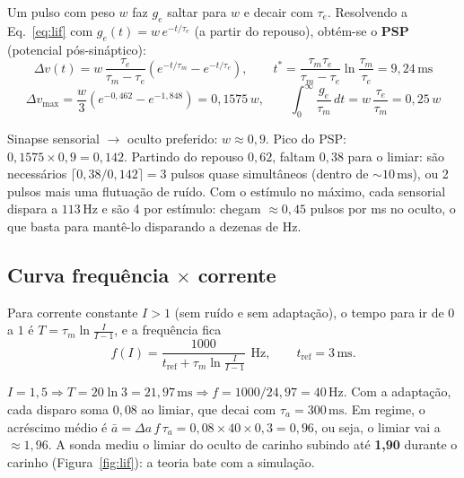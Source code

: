 \documentclass[11pt,a4paper]{article}
\newcommand{\ms}{\,\mathrm{ms}}
\newcommand{\Hz}{\,\mathrm{Hz}}
\begin{document}
Um pulso com peso $w$ faz $g_e$ saltar para $w$ e decair com $\tau_e$. Resolvendo a Eq.~\eqref{eq:lif} com $g_e(t) = w\,e^{-t/\tau_e}$
(a partir do repouso), obtém-se o \textbf{PSP} (potencial pós-sináptico):
\begin{equation}
\Delta v(t) = w\,\frac{\tau_e}{\tau_m - \tau_e}\left(e^{-t/\tau_m} - e^{-t/\tau_e}\right),
\qquad t^\ast = \frac{\tau_m\tau_e}{\tau_m-\tau_e}\ln\frac{\tau_m}{\tau_e} = 9{,}24\ms
\end{equation}
\begin{equation}
\Delta v_{\max} = \frac{w}{3}\left(e^{-0{,}462} - e^{-1{,}848}\right) = 0{,}1575\,w, \qquad
\int_0^\infty \frac{g_e}{\tau_m}\,dt = w\,\frac{\tau_e}{\tau_m} = 0{,}25\,w
\end{equation}

\begin{exemplo}
Sinapse sensorial $\to$ oculto preferido: $w \approx 0{,}9$. Pico do PSP: $0{,}1575 \times 0{,}9 = 0{,}142$.
Partindo do repouso $0{,}62$, faltam $0{,}38$ para o limiar: são necessários
$\lceil 0{,}38 / 0{,}142 \rceil = 3$ pulsos quase simultâneos (dentro de $\sim 10\ms$), ou 2 pulsos mais uma flutuação de ruído.
Com o estímulo no máximo, cada sensorial dispara a $113\Hz$ e são 4 por estímulo: chegam $\approx 0{,}45$ pulsos por ms no oculto,
o que basta para mantê-lo disparando a dezenas de Hz.
\end{exemplo}

\subsection{Curva frequência $\times$ corrente}

Para corrente constante $I > 1$ (sem ruído e sem adaptação), o tempo para ir de $0$ a $1$ é
$T = \tau_m \ln\frac{I}{I-1}$, e a frequência fica
\begin{equation}
f(I) = \frac{1000}{t_\text{ref} + \tau_m\ln\frac{I}{I-1}}\ \Hz, \qquad t_\text{ref} = 3\ms .
\end{equation}

\begin{exemplo}
$I = 1{,}5 \Rightarrow T = 20\ln 3 = 21{,}97\ms \Rightarrow f = 1000/24{,}97 = 40\Hz$.
Com a adaptação, cada disparo soma $0{,}08$ ao limiar, que decai com $\tau_a = 300\ms$. Em regime, o acréscimo médio é
$\bar a = \Delta a\, f\, \tau_a = 0{,}08 \times 40 \times 0{,}3 = 0{,}96$, ou seja, o limiar vai a $\approx 1{,}96$.
A sonda mediu o limiar do oculto de carinho subindo até \textbf{1,90} durante o carinho (Figura~\ref{fig:lif}): a teoria bate com a simulação.
\end{exemplo}
\end{document}
